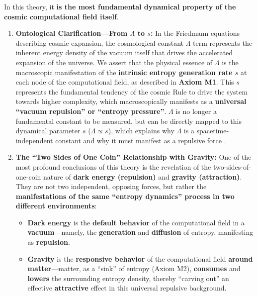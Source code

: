 \documentclass[11pt, a4paper]{article}
\begin{document}
\begin{itemize}
    In this theory, it \textbf{is the most fundamental dynamical property of the cosmic computational field itself}.
    \begin{enumerate}
        \item \textbf{Ontological Clarification—From $\Lambda$ to $s$: } In the Friedmann equations describing cosmic expansion, the cosmological constant $\Lambda$ term represents the inherent energy density of the vacuum itself that drives the accelerated expansion of the universe. We assert that the physical essence of $\Lambda$ is the macroscopic manifestation of the \textbf{intrinsic entropy generation rate $s$} at each node of the computational field, as described in \textbf{Axiom M1}. This $s$ represents the fundamental tendency of the cosmic Rule to drive the system towards higher complexity, which macroscopically manifests as a \textbf{universal ``vacuum repulsion'' or ``entropy pressure''}. $\Lambda$ is no longer a fundamental constant to be measured, but can be directly mapped to this dynamical parameter $s$ ($\Lambda \propto s$), which explains why $\Lambda$ is a spacetime-independent constant and why it must manifest as a repulsive force \cite{Planck2020}.

        \item \textbf{The ``Two Sides of One Coin'' Relationship with Gravity:} One of the most profound conclusions of this theory is the revelation of the two-sides-of-one-coin nature of \textbf{dark energy (repulsion)} and \textbf{gravity (attraction)}. They are not two independent, opposing forces, but rather the \textbf{manifestations of the same ``entropy dynamics'' process in two different environments}:
        \begin{itemize}
            \item \textbf{Dark energy} is the \textbf{default behavior} of the computational field in a \textbf{vacuum}—namely, the \textbf{generation} and \textbf{diffusion} of entropy, manifesting as \textbf{repulsion}.
            \item \textbf{Gravity} is the \textbf{responsive behavior} of the computational field \textbf{around matter}—matter, as a ``sink'' of entropy (Axiom M2), \textbf{consumes} and \textbf{lowers} the surrounding entropy density, thereby ``carving out'' an effective \textbf{attractive} effect in this universal repulsive background.
        \end{itemize}


\end{enumerate}
\end{itemize}
\end{document}
